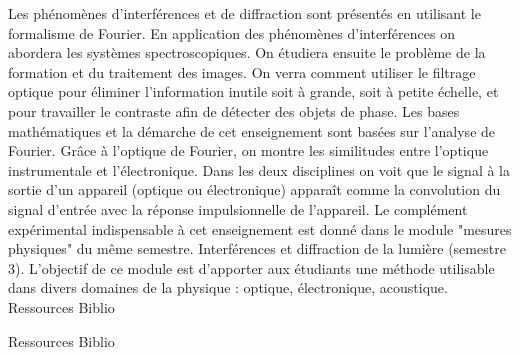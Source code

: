 \documentclass[10pt, a5paper]{report}
\begin{document}
{Les phénomènes d'interférences et de diffraction sont présentés en utilisant le formalisme de Fourier. En application des phénomènes d'interférences on abordera les systèmes spectroscopiques. On étudiera ensuite le problème de la formation et du traitement des images. On verra comment utiliser le filtrage optique pour éliminer l'information inutile soit à grande, soit à petite échelle, et pour travailler le contraste afin de détecter des objets de phase.\vskip 0mm
Les bases mathématiques et la démarche de cet enseignement sont basées sur l'analyse de Fourier. Grâce à l'optique de Fourier, on montre les similitudes entre l'optique instrumentale et l'électronique. Dans les deux disciplines on voit que le signal à la sortie d'un appareil (optique ou électronique) apparaît comme la convolution du signal d'entrée avec la réponse impulsionnelle de l'appareil. Le complément expérimental indispensable à cet enseignement est donné dans le module "mesures physiques" du même semestre.}
{Interférences et diffraction de la lumière (semestre 3).}
{L'objectif de ce module est d'apporter aux étudiants une méthode utilisable dans divers domaines de la physique : optique, électronique, acoustique. }
{Ressources} 
{Biblio} 
 
\vfill


{}
{}
{}
{Ressources} 
{Biblio} 
 
\vfill



\end{document}
